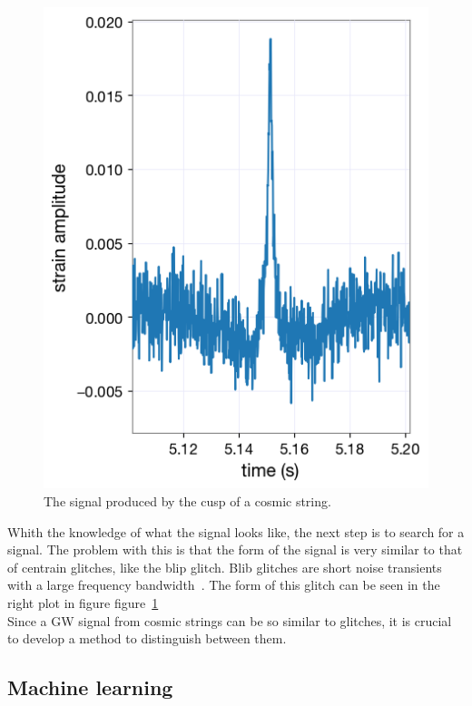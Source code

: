 \documentclass{article}
\begin{document}
\begin{multicols}{2}
\begin{figure}[h!]
    \includegraphics[width=\linewidth]{../Dataplots/injection3.png}
    \caption{The signal produced by the cusp of a cosmic string.}
    \label{CS_signal_and_glitch}
\end{figure}
\indent
Whith the knowledge of what the signal looks like, the next step is to search for a signal.
The problem with this is that the form of the signal is very similar to that of centrain glitches, like the blip glitch.
Blib glitches are short noise transients with a large frequency bandwidth~\cite{Cabero_2019}. 
The form of this glitch can be seen in the right plot in figure figure~\ref{CS_signal_and_glitch}\\
\indent
Since a GW signal from cosmic strings can be so similar to glitches, it is crucial to develop a method to distinguish between them.

\subsection{Machine learning}



\end{multicols}
\end{document}
